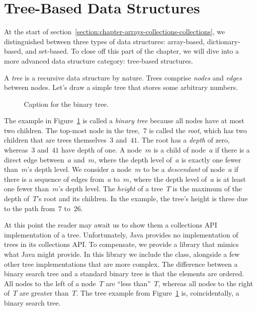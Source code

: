 \section{Tree-Based Data Structures}
At the start of section~\ref{section:chapter-arrays-collections-collections}, we distinguished between three types of data structures: array-based, dictionary-based, and set-based. 
To close off this part of the chapter, we will dive into a more advanced data structure category: tree-based structures.

A \emph{tree} is a recursive data structure by nature. 
Trees comprise \emph{nodes} and \emph{edges} between nodes. 
Let's draw a simple tree that stores some arbitrary numbers.

\begin{figure}[ht]
\centering
{}
\caption{Caption for the binary tree.}
\label{fig:binarytree}
\end{figure}

The example in Figure~\ref{fig:binarytree} is called a \emph{binary tree} because all nodes have at most two children. 
The top-most node in the tree,~$7$ is called the \emph{root}, which has two children that are trees themselves~$3$ and~$41$. 
The root has a \emph{depth} of zero, whereas~$3$ and~$41$ have depth of one. 
A node~$m$ is a child of node~$a$ if there is a direct edge between~$a$ and~$m$, where the depth level of~$a$ is exactly one fewer than~$m$'s depth level. 
We consider a node~$m$ to be a \emph{descendant} of node~$a$ if there is a sequence of edges from~$a$ to~$m$, where the depth level of~$a$ is at least one fewer than~$m$'s depth level. 
The \emph{height} of a tree~$T$ is the maximum of the depth of~$T$'s root and its children. 
In the example, the tree's height is three due to the path from~$7$ to~$26$.

At this point the reader may await us to show them a collections API implementation of a tree. 
Unfortunately, Java provides no implementation of trees in its collections API. 
To compensate, we provide a library that mimics what Java might provide. In this library we include the  class, alongside a few other tree implementations that are more complex. 
The difference between a binary search tree and a standard binary tree is that the elements are ordered. 
All nodes to the left of a node~$T$ are ``less than''~$T$, whereas all nodes to the right of~$T$ are greater than~$T$.
The tree example from Figure~\ref{fig:binarytree} is, coincidentally, a binary search tree.

